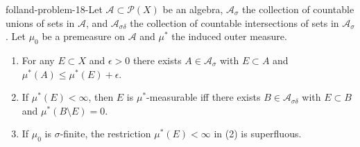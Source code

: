 \begin{mystexercise}{}{folland-problem-18-}\label{Folland-Problem-18-}\label{folland-problem-18-}Let $\mathcal{A} \subset \mathcal{P}(X)$ be an algebra, $\mathcal{A}_\sigma$ the collection of countable unions of sets in $\mathcal{A}$, and $\mathcal{A}_{\sigma\delta}$ the collection of countable intersections of sets in $\mathcal{A}_\sigma$. Let $\mu_0$ be a premeasure on $\mathcal{A}$ and $\mu^*$ the induced outer measure.

\begin{enumerate}
\item For any $E \subset X$ and $\epsilon > 0$ there exists $A \in \mathcal{A}_\sigma$ with $E \subset A$ and $\mu^*(A) \le \mu^*(E) + \epsilon$.
\item If $\mu^*(E) < \infty$, then $E$ is $\mu^*$-measurable iff there exists $B \in \mathcal{A}_{\sigma\delta}$ with $E \subset B$ and $\mu^*(B \setminus E) = 0$.
\item If $\mu_0$ is $\sigma$-finite, the restriction $\mu^*(E) < \infty$ in (2) is superfluous.
\end{enumerate}

\end{mystexercise}
